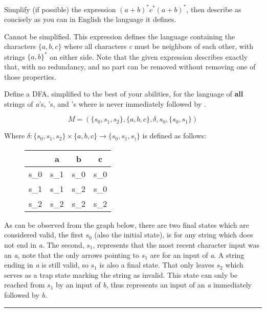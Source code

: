 \documentclass[12pt]{jhwhw}
\begin{document}
	Simplify (if possible) the expression $(a+b)^*c^*(a+b)^*$, then describe as concisely as you can
	in English the language it defines.

\solution

	Cannot be simplified.
	\bigbreak
	This expression defines the language containing the characters $\{a,b,c\}$ where all characters \textit{c} must
	be neighbors of each other, with strings $\{a,b\}^*$ on either side.
	Note that the given expression describes exactly that, with no redundancy, 
	and no part can be removed without removing one of those properties.

\problem{}

	Define a DFA, simplified to the best of your abilities, for the language of \textbf{all} strings of 
	\textit{a}'s, 's, and 's where  is never immediately followed by .

\solution

	$$
		M = (\{s_0,s_1,s_2\},\{a,b,c\},\delta, s_0, \{s_0,s_1\})
	$$

	Where $\delta: \{s_0, s_1, s_2\} \times \{a,b,c\} \rightarrow \{s_0,s_1,s_)\}$ is defined as follows: \\
	\begin{figure}[htp]
		\centering
		\begin{tabular}{||c|c c c||}
			\hline
			\delta & a & b & c \\ \hline
			s_0 & s_1 & s_0 & s_0 \\ \hline
			s_1 & s_1 & s_2 & s_0 \\ \hline
			s_2 & s_2 & s_2 & s_2 \\ \hline
		\end{tabular}
	\end{figure}

	As can be observed from the graph below, there are two final states which are considered valid,
	the first $s_0$ (also the initial state), is for any string which does not end in \textit{a}.
	The second, $s_1$, represents that the most recent character input was an \textit{a}, note that
	the only arrows pointing to $s_1$ are for an input of \textit{a}. A string ending in \textit{a} is still
	valid, so $s_1$ is also a final state. That only leaves $s_2$ which serves as a trap state marking
	the string as invalid. This state can only be reached from $s_1$ by an input of \textit{b}, thus 
	represents an input of an \textit{a} immediately followed by \textit{b}.

	\textcolor[RGB]{220,220,220}{\rule{\textwidth}{0.5pt}}
\end{document}
